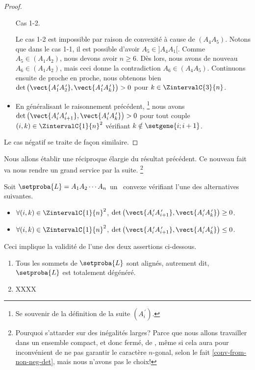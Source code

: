 \begin{proof}
\begin{itemize}
\begin{multicols}{2}
        	\smallskip
            Cas 1-2.
        \end{multicols}
    
		\noindent
		Le cas 1-2 est impossible par raison de convexité à cause de $(A_4 A_5)$.
		Notons que dans le cas 1-1, il est possible d'avoir $A_5 \in ]A_4 A_1[$.
		Comme $A_5 \in (A_1 A_2)$, nous devons avoir $n \geq 6$.
		Dès lors, nous avons de nouveau $A_6 \in (A_1 A_2)$, mais ceci donne la contradiction $A_6 \in (A_4 A_5)$.
		Continuons ensuite de proche en proche, nous obtenons bien
		$\det \big( \vect{A^{\,\prime}_1 A^{\,\prime}_2}, \vect{A^{\,\prime}_1 A^{\,\prime}_k} \big) > 0$
		pour $k \in \ZintervalC{3}{n}$.


		\item En généralisant le raisonnement précédent,%
		\footnote{
		    Se souvenir de la définition de la suite $(A^{\,\prime}_i)$.
		}
		nous avons
		$\det \big( \vect{A^{\,\prime}_i A^{\,\prime}_{i+1}}, \vect{A^{\,\prime}_i A^{\,\prime}_k} \big) > 0$
		pour tout couple $(i, k) \in \ZintervalC{1}{n}^2$ vérifiant $k \notin \setgene{i ; i+1}$.
	\end{itemize}


    \noindent
    Le cas négatif se traite de façon similaire.
\end{proof}




\newpage %

Nous allons établir une réciproque élargie du résultat précédent. Ce nouveau fait va nous rendre un grand service par la suite.%
\footnote{
    Pourquoi s'attarder sur des inégalités larges? Parce que nous allons travailler dans un ensemble compact, et donc fermé, de \ncycles, même si cela aura pour inconvénient de ne pas garantir le caractère $n$-gonal, selon le fait \ref{conv-from-non-neg-det}, mais nous n'avons pas le choix!
}


\begin{fact} \label{conv-from-non-neg-det}
    Soit $\setproba{L} = A_1 A_2 \cdots A_n$ un \ncycle\ convexe vérifiant l'une des alternatives suivantes.
	\begin{itemize}
		\item $\forall (i, k) \in \ZintervalC{1}{n}^2$,
		$\det \big( \vect{A^{\,\prime}_i A^{\,\prime}_{i+1}}, \vect{A^{\,\prime}_i A^{\,\prime}_k} \big) \geq 0$.

		\item $\forall (i, k) \in \ZintervalC{1}{n}^2$,
		$\det \big( \vect{A^{\,\prime}_i A^{\,\prime}_{i+1}}, \vect{A^{\,\prime}_i A^{\,\prime}_k} \big) \leq 0$.
    \end{itemize}
    
    Ceci implique la validité de l'une des deux assertions ci-dessous.
	\begin{enumerate}[label=\roman*.]
		\item Tous les sommets de $\setproba{L}$ sont alignés, autrement dit, $\setproba{L}$ est totalement dégénéré.

		\item XXXX
    \end{enumerate}
\end{fact}


